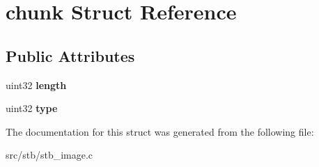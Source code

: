 \hypertarget{structchunk}{}\section{chunk Struct Reference}
\label{structchunk}
\subsection*{Public Attributes}
\begin{DoxyCompactItemize}
\item 
\mbox{\label{structchunk_a0b5cc0c5a9b91945c42373db2a499fb1}} 
uint32 {\bfseries length}
\item 
\mbox{\label{structchunk_a05d5489f3807bc7ba149c1904241d087}} 
uint32 {\bfseries type}
\end{DoxyCompactItemize}


The documentation for this struct was generated from the following file\+:\begin{DoxyCompactItemize}
\item 
src/stb/stb\+\_\+image.\+c\end{DoxyCompactItemize}
